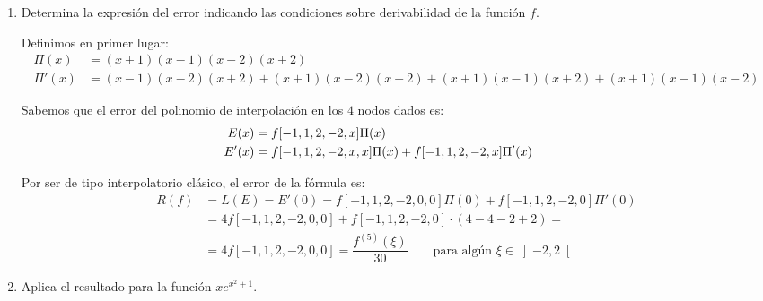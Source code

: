 \begin{ejercicio}
\begin{enumerate}
        \item Determina la expresión del error indicando las condiciones sobre derivabilidad de la función $f$.
        
        Definimos en primer lugar:
        \begin{align*}
            \Pi(x) &= (x+1)(x-1)(x-2)(x+2)\\
            \Pi'(x) &= (x-1)(x-2)(x+2) + (x+1)(x-2)(x+2) + (x+1)(x-1)(x+2) + (x+1)(x-1)(x-2)
        \end{align*}

        Sabemos que el error del polinomio de interpolación en los $4$ nodos dados es:
        \begin{align*}
            \hspace{-1cm}E(x) &= f[-1, 1, 2, -2, x]\Pi(x)\\
            \hspace{-1cm}E'(x) &= f[-1, 1, 2, -2, x, x]\Pi(x) + f[-1, 1, 2, -2, x]\Pi'(x)
        \end{align*}

        Por ser de tipo interpolatorio clásico, el error de la fórmula es:
        \begin{align*}
            R(f) &= L(E) = E'(0) = f[-1, 1, 2, -2, 0, 0]\Pi(0) + f[-1, 1, 2, -2, 0]\Pi'(0)\\
            &= 4f[-1, 1, 2, -2, 0, 0] + f[-1, 1, 2, -2, 0]\cdot (4-4-2+2)
            =\\&= 4f[-1, 1, 2, -2, 0, 0] = \dfrac{f^{(5)}(\xi)}{30} \qquad \text{para algún }\xi\in\left]-2,2\right[
        \end{align*}
        
        \item Aplica el resultado para la función $x e^{x^2 + 1}$.
        
        
    \end{enumerate}
\end{ejercicio}